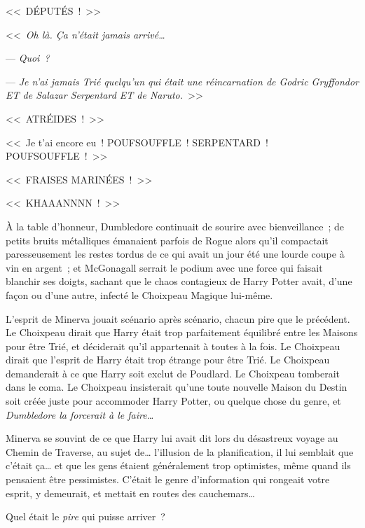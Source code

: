 \later

<<~DÉPUTÉS~!~>>

\later

<<~\emph{Oh là. Ça n'était jamais arrivé…}

--- \emph{Quoi~?}

--- \emph{Je n'ai jamais Trié quelqu'un qui était une réincarnation de Godric Gryffondor ET de Salazar Serpentard ET de Naruto.}~>>

\later

<<~ATRÉIDES~!~>>

\later

<<~Je t'ai encore eu~! POUFSOUFFLE~! SERPENTARD~! POUFSOUFFLE~!~>>

\later

<<~FRAISES MARINÉES~!~>>

\later

<<~KHAAANNNN~!~>>

\later

À la table d'honneur, Dumbledore continuait de sourire avec bienveillance~; de petits bruits métalliques émanaient parfois de Rogue alors qu'il compactait paresseusement les restes tordus de ce qui avait un jour été une lourde coupe à vin en argent~; et McGonagall serrait le podium avec une force qui faisait blanchir ses doigts, sachant que le chaos contagieux de Harry Potter avait, d'une façon ou d'une autre, infecté le Choixpeau Magique lui-même.

L'esprit de Minerva jouait scénario après scénario, chacun pire que le précédent. Le Choixpeau dirait que Harry était trop parfaitement équilibré entre les Maisons pour être Trié, et déciderait qu'il appartenait à toutes à la fois. Le Choixpeau dirait que l'esprit de Harry était trop étrange pour être Trié. Le Choixpeau demanderait à ce que Harry soit exclut de Poudlard. Le Choixpeau tomberait dans le coma. Le Choixpeau insisterait qu'une toute nouvelle Maison du Destin soit créée juste pour accommoder Harry Potter, ou quelque chose du genre, et \emph{Dumbledore la forcerait à le faire…}

Minerva se souvint de ce que Harry lui avait dit lors du désastreux voyage au Chemin de Traverse, au sujet de… l'illusion de la planification, il lui semblait que c'était ça… et que les gens étaient généralement trop optimistes, même quand ils pensaient être pessimistes. C'était le genre d'information qui rongeait votre esprit, y demeurait, et mettait en routes des cauchemars…

Quel était le \emph{pire} qui puisse arriver~?

